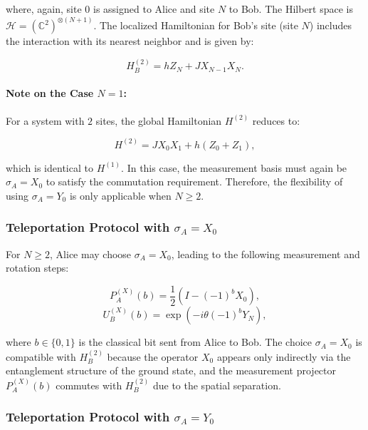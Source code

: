 where, again, site \( 0 \) is assigned to Alice and site \( N \) to Bob. The Hilbert space is \( \mathcal{H} = (\mathbb{C}^2)^{\otimes (N+1)} \). The localized Hamiltonian for Bob’s site (site \( N \)) includes the interaction with its nearest neighbor and is given by:

\begin{equation}
H_B^{(2)} = h Z_N + J X_{N-1} X_N.
\end{equation}

\paragraph{Note on the Case \( N = 1 \):} For a system with $2$ sites, the global Hamiltonian \( H^{(2)} \) reduces to:

\begin{equation*}
H^{(2)} = J X_0 X_1 + h (Z_0 + Z_1),
\end{equation*}

which is identical to \( H^{(1)} \). In this case, the measurement basis must again be \( \sigma_A = X_0 \) to satisfy the commutation requirement. Therefore, the flexibility of using \( \sigma_A = Y_0 \) is only applicable when \( N \geq 2 \).

\subsubsection{Teleportation Protocol with \texorpdfstring{\( \sigma_A = X_0 \)}{sigmaAX0}}

For \( N \geq 2 \), Alice may choose \( \sigma_A = X_0 \), leading to the following measurement and rotation steps:

\begin{equation}
P_A^{(X)}(b) = \frac{1}{2} \left( I - (-1)^b X_0 \right),
\end{equation}
\begin{equation}
U_B^{(X)}(b) = \exp\left( -i \theta (-1)^b Y_N \right),
\end{equation}

where \( b \in \{0,1\} \) is the classical bit sent from Alice to Bob. The choice \( \sigma_A = X_0 \) is compatible with \( H_B^{(2)} \) because the operator \( X_0 \) appears only indirectly via the entanglement structure of the ground state, and the measurement projector \( P_A^{(X)}(b) \) commutes with \( H_B^{(2)} \) due to the spatial separation.

\subsubsection{Teleportation Protocol with \texorpdfstring{\( \sigma_A = Y_0 \)}{sigmaAY0}}

